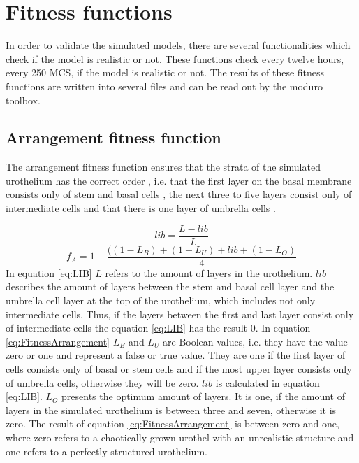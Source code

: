 \section{Fitness functions}\label{sec:fitnessFunctions}
In order to validate the simulated models, there are several functionalities which check if the model is realistic or not. These functions check every twelve hours, every 250 \ac{MCS}, if the model is realistic or not. The results of these fitness functions are written into several files and can be read out by the moduro toolbox.

\subsection{Arrangement fitness function} \label{subsec:ArrangementFitness}
The arrangement fitness function ensures that the strata of the simulated urothelium has the correct order \cite{Torelli2017}, i.e. that the first layer on the basal membrane consists only of stem and basal cells \cite{Yamany2014, Lazzeri2006}, the next three to five layers consist only of intermediate cells \cite{PuneetKhandelwal2009} and that there is one layer of umbrella cells \cite{PuneetKhandelwal2009, Yamany2014}.

\begin{equation}\label{eq:LIB}
lib = \dfrac{L - lib}{L}
\end{equation}
\begin{equation}\label{eq:FitnessArrangement} 
f_{A} = 1 - \dfrac{((1-L_{B})+(1-L_{U})+lib+(1-L_{O})}{4}
\end{equation}
In equation \ref{eq:LIB} $L$ refers to the amount of layers in the urothelium. $lib$ describes the amount of layers between the stem and basal cell layer and the umbrella cell layer at the top of the urothelium, which includes not only intermediate cells. Thus, if the layers between the first and last layer consist only of intermediate cells the equation \ref{eq:LIB} has the result 0.\newline
In equation \ref{eq:FitnessArrangement} $L_{B}$ and $L_{U}$ are Boolean values, i.e. they have the value zero or one and represent a false or true value. They are one if the first layer of cells consists only of basal or stem cells and if the most upper layer consists only of umbrella cells, otherwise they will be zero.
$lib$ is calculated in equation \ref{eq:LIB}. $L_{O}$ presents the optimum amount of layers. It is one, if the amount of layers in the simulated urothelium is between three and seven, otherwise it is zero. The result of equation \ref{eq:FitnessArrangement} is between zero and one, where zero refers to a chaotically grown urothel with an unrealistic structure and one refers to a perfectly structured urothelium. \newline


